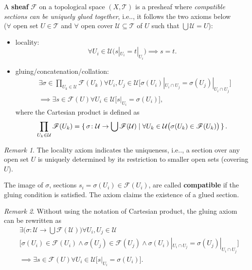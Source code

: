 \documentclass[12pt, letterpaper]{article}
\makeatletter
\newcommand\ie{i.e\@ifnextchar.{}{.\@}}
\theoremstyle{definition}
\theoremstyle{remark}
\newtheorem*{rem*}{Remark}
\theoremstyle{definition}
\theoremstyle{plain}
\numberwithin{equation}{section}
\makeatother
\begin{document}
	\begin{def*}[sheaf]
		A \textbf{sheaf} $\mathscr{F}$ on a topological space $(X,\mathcal{T})$ is a presheaf
		where \textit{compatible sections can be uniquely glued together}, \ie,
		it follows the two axioms below\\
		($\forall$ open set $U\in \mathcal{T}$ and $\forall$ open cover $\mathcal{U}\subseteq\mathcal{T}$ of $U$
		such that $\bigcup \mathcal{U} = U$):
		\begin{itemize}
			\item locality: 
			\[\forall U_i\in\mathcal{U}\big(s|_{U_i}=t|_{U_i} \big) \implies s=t.\]
			\item gluing/concatenation/collation:
			\[
			\begin{aligned}
				&\exists \sigma \in \prod_{U_k\in\mathcal{U}} \mathscr{F}(U_k) \forall U_i,U_j\in\mathcal{U}
				 \big[\sigma(U_i)|_{U_i\cap U_j}=\sigma(U_j)|_{U_i\cap U_j}\big]\\
				&\implies \exists s\in\mathscr{F}(U)\forall U_i\in \mathcal{U}\big[ s|_{U_i}=\sigma(U_i)\big],
			\end{aligned}\]
			where the Cartesian product is defined as
			\[  \prod_{U_k\in\mathcal{U}}\mathscr{F}(U_k)  = \set{ \sigma\colon  \mathcal{U} \to \bigcup \mathscr{F}(\mathcal{U})
			| \forall U_k\in \mathcal{U}  \big( \sigma(U_k)\in \mathscr{F}(U_k) \big)	
			} .\]
		\end{itemize}
	\end{def*}
	\begin{rem*}
		The locality axiom indicates the uniqueness, \ie,
		a section over any open set $U$ is uniquely determined by its restriction to smaller open sets (covering $U$).
		
		The image of $\sigma$, sections $s_i=\sigma(U_i)\in\mathscr{F}(U_i)$, are called \textbf{compatible} if
		the gluing condition is satisfied. The axiom claims the existence of a glued section.
	\end{rem*}
	\begin{rem*}
		Without using the notation of Cartesian product, the gluing axiom can be rewritten as
		\[\begin{aligned}
			&\exists\big( \sigma\colon \mathcal{U} \to \bigcup \mathscr{F}(\mathcal{U})\big) \forall U_i,U_j\in
			\mathcal{U}\\
			& \big[\sigma(U_i)\in\mathscr{F}(U_i) \land \sigma(U_j)\in\mathscr{F}(U_j) 
			\land \sigma(U_i)|_{U_i\cap U_j}=\sigma(U_j)|_{U_i\cap U_j}
			\big]\\
			&\implies \exists s\in\mathscr{F}(U)\forall U_i\in \mathcal{U}\big[ s|_{U_i}=\sigma(U_i)\big]. 
		\end{aligned}\]
	\end{rem*}
\end{document}
